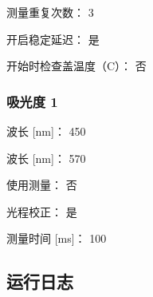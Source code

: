 \documentclass[UTF8,10pt,a4paper,fontset=fandol]{ctexart}
\newcommand{\fieldvalue}[1]{#1}
\begin{document}
\begin{center}
\begin{center}
\noindent
测量重复次数：%
\fieldvalue{3}

\noindent
开启稳定延迟：%
\fieldvalue{是}

\noindent
开始时检查盖温度（\textdegree C）：%
\fieldvalue{否}

\subsubsection*{吸光度 1}

\noindent
波长 [nm]：%
\fieldvalue{450}

\noindent
波长 [nm]：%
\fieldvalue{570}

\noindent
使用测量：%
\fieldvalue{否}

\noindent
光程校正：%
\fieldvalue{是}

\noindent
测量时间 [ms]：%
\fieldvalue{100}

\subsection*{运行日志}


\end{center}
\end{center}
\end{document}
